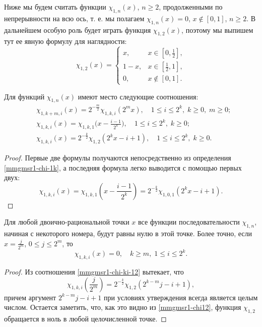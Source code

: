 Ниже мы будем считать функции $\chi_{1,n}(x)$, $n \ge 2$, продолженными по непрерывности на всю ось, т. е. мы полагаем $\chi_{1,n}(x)=0$, $x \notin [0,1]$, $n \ge 2$. В дальнейшем особую роль будет играть функция $\chi_{1,2}(x)$, поэтому мы выпишем тут ее явную формулу для наглядности:
\begin{equation}\label{mmgmsr1-chi12}
\chi_{1,2}(x)=
\begin{cases}
x, &x \in [0,\frac{1}{2}],\\
1-x, &x \in [\frac{1}{2},1],\\
0, &x \notin [0,1].
\end{cases}
\end{equation}

\begin{statement}
	Для функций $\chi_{1,n}(x)$ имеют место следующие соотношения:
	\begin{align}
	\label{mmgmsr1-chi-k-m}
	&\chi_{1,k+m,i}(x)=2^{-\frac{m}{2}}\chi_{1,k,i}(2^m x), \quad 1 \le i \le 2^k, \; k \ge 0, \; m \ge 0;\\
	\label{mmgmsr1-chi-i-1}
	&\chi_{1,k,i}(x)=\chi_{1,k,1}\bigl(x - \frac{i-1}{2^k}\bigr), \quad 1 \le i \le 2^k, \; k \ge 0;\\
	\label{mmgmsr1-chi-ki-12}
	&\chi_{1,k,i}(x)=2^{-\frac{k}{2}}\chi_{1,2}(2^kx-i+1), \quad 1 \le i \le 2^k, \; k \ge 0.
	\end{align}
\end{statement}
\begin{proof}
	Первые две формулы получаются непосредственно из определения \eqref{mmgmsr1-chi-1k}, а последняя формула легко выводится с помощью первых двух:
	\begin{equation*}
	\chi_{1,k,i}(x)=\chi_{1,k,1}(x - \frac{i-1}{2^k})=2^{-\frac{k}{2}}\chi_{1,0,1}(2^kx-i+1).
	\end{equation*}
\end{proof}

\begin{statement}\label{mmgmsr1-st-zero-for-bin}
	Для любой двоично-рациональной точки $x$ все функции последовательности $\chi_{1,n}$, начиная с некоторого номера, будут равны нулю в этой точке. Более точно, если $x=\frac{j}{2^m}$, $0 \le j \le 2^m$, то
	\begin{equation*}
	\chi_{1,k,i}(x)=0, \quad k \ge m, \; 1 \le i \le 2^k.
	\end{equation*}
\end{statement}
\begin{proof}
	Из соотношения \eqref{mmgmsr1-chi-ki-12} вытекает, что
	\begin{equation*}
	\chi_{1,k,i}(\frac{j}{2^m})=2^{-\frac{k}{2}}\chi_{1,2}(2^{k-m}j-i+1),
	\end{equation*}
	причем аргумент $2^{k-m}j-i+1$ при условиях утверждения всегда является целым числом. Остается заметить, что, как это видно из \eqref{mmgmsr1-chi12}, функция $\chi_{1,2}$ обращается в ноль в любой целочисленной точке.
\end{proof}

